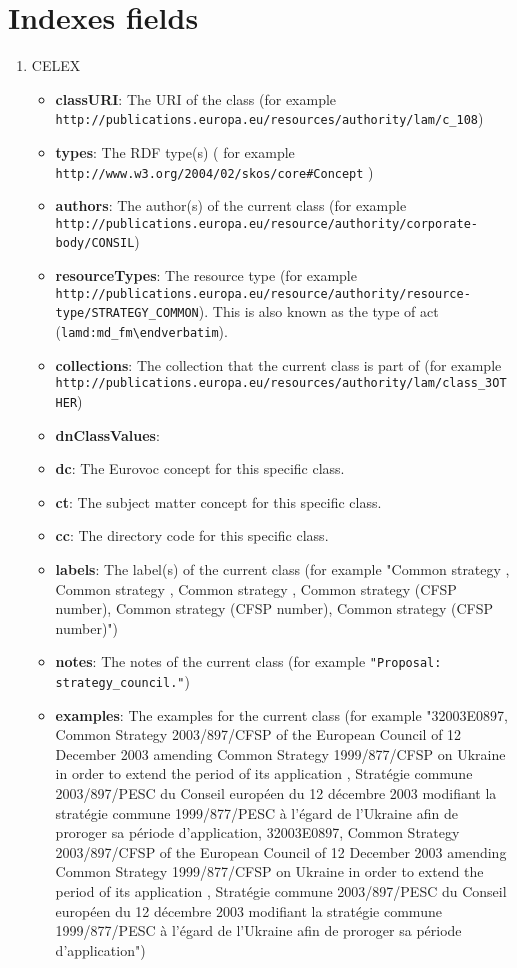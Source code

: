 \section{Indexes fields}
\label{sec:indexes_fields}
\begin{enumerate}
	\item CELEX
	\begin{itemize}
		\item \textbf{classURI}: The URI of the class (for example \lstinline!http://publications.europa.eu/resources/authority/lam/c_108!)
		\item \textbf{types}: The RDF type(s) ( for example \lstinline!http://www.w3.org/2004/02/skos/core#Concept! )
		\item \textbf{authors}: The author(s) of the current class (for example \lstinline!http://publications.europa.eu/resource/authority/corporate-body/CONSIL!)
		\item \textbf{resourceTypes}: The resource type (for example \lstinline!http://publications.europa.eu/resource/authority/resource-type/STRATEGY_COMMON!). This is also known as the type of act (\lstinline!lamd:md_fm\endverbatim!).
		\item \textbf{collections}: The collection that the current class is part of (for example \lstinline!http://publications.europa.eu/resources/authority/lam/class_3OTHER!)
		\item \textbf{dnClassValues}:
		\item \textbf{dc}: The Eurovoc concept for this specific class.
		\item \textbf{ct}: The subject matter concept for this specific class.
		\item \textbf{cc}: The directory code for this specific class.
		\item \textbf{labels}: The label(s) of the current class (for example "Common strategy , Common strategy , Common strategy , Common strategy (CFSP number), Common strategy (CFSP number), Common strategy (CFSP number)")
		\item \textbf{notes}: The notes of the current class (for example \lstinline!"Proposal: strategy_council."!)
		\item \textbf{examples}: The examples for the current class (for example "32003E0897, Common Strategy 2003/897/CFSP of the European Council of 12 December 2003 amending Common Strategy 1999/877/CFSP on Ukraine in order to extend the period of its application , Stratégie commune 2003/897/PESC du Conseil européen du 12 décembre 2003 modifiant la stratégie commune 1999/877/PESC à l'égard de l'Ukraine afin de proroger sa période d'application, 32003E0897, Common Strategy 2003/897/CFSP of the European Council of 12 December 2003 amending Common Strategy 1999/877/CFSP on Ukraine in order to extend the period of its application , Stratégie commune 2003/897/PESC du Conseil européen du 12 décembre 2003 modifiant la stratégie commune 1999/877/PESC à l'égard de l'Ukraine afin de proroger sa période d'application")

\end{itemize}
\end{enumerate}

